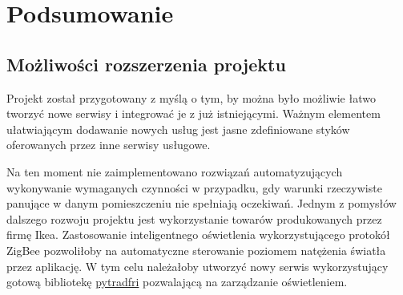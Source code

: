 \newpage
\section{Podsumowanie}
\subsection{Możliwości rozszerzenia projektu}

Projekt został przygotowany z myślą o tym, by można było możliwie łatwo tworzyć nowe 
serwisy i integrować je z już istniejącymi. Ważnym elementem ułatwiającym dodawanie 
nowych usług jest jasne zdefiniowane styków oferowanych przez inne serwisy usługowe. 

Na ten moment nie zaimplementowano rozwiązań automatyzujących wykonywanie wymaganych 
czynności w przypadku, gdy warunki rzeczywiste panujące w danym pomieszczeniu nie 
spełniają oczekiwań. Jednym z pomysłów dalszego rozwoju projektu jest wykorzystanie 
towarów produkowanych przez firmę Ikea. Zastosowanie inteligentnego oświetlenia 
wykorzystującego protokół ZigBee pozwoliłoby na automatyczne sterowanie poziomem 
natężenia światła przez aplikację. W tym celu należałoby utworzyć nowy serwis 
wykorzystujący gotową bibliotekę \href{https://github.com/home-assistant-libs/pytradfri}{pytradfri} 
pozwalającą na zarządzanie oświetleniem.